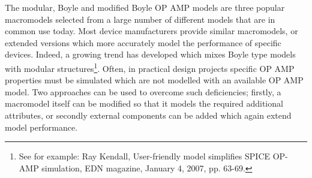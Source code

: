 The modular, Boyle and modified Boyle OP AMP models are three popular macromodels selected from a large number of different models that are in common use today. Most device manufacturers provide similar macromodels, or extended versions which more accurately model the performance of specific devices.  Indeed, a growing trend has developed which mixes Boyle type models with modular structures\footnote{See for example: Ray Kendall, User-friendly model simplifies SPICE OP-AMP simulation, EDN magazine, January 4, 2007, pp. 63-69.}. Often, in practical design projects specific OP AMP properties must be simulated which are not modelled with an available OP AMP model. Two approaches can be used to overcome such deficiencies; firstly, a macromodel itself can be modified so that it models the required additional attributes, or secondly external components can be added which again extend model performance.


